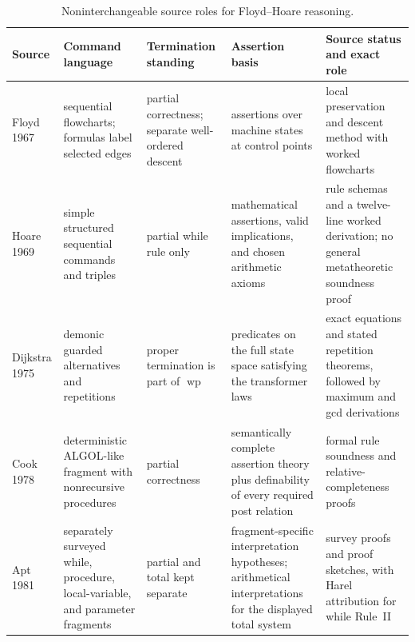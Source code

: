 \begin{table}[htbp]
\centering\scriptsize
\begin{tabularx}{\textwidth}{@{}l X X X X@{}}
\toprule
Source & Command language & Termination standing & Assertion basis &
Source status and exact role \\
\midrule
Floyd 1967 & sequential flowcharts; formulas label selected edges &
partial correctness; separate well-ordered descent & assertions over machine
states at control points & local preservation and descent method with worked
flowcharts \\
Hoare 1969 & simple structured sequential commands and triples &
partial while rule only & mathematical assertions, valid implications, and
chosen arithmetic axioms & rule schemas and a twelve-line worked derivation;
no general metatheoretic soundness proof \\
Dijkstra 1975 & demonic guarded alternatives and repetitions &
proper termination is part of \(\operatorname{wp}\) & predicates on the full
state space satisfying the transformer laws & exact equations and stated
repetition theorems, followed by maximum and gcd derivations \\
Cook 1978 & deterministic ALGOL-like fragment with nonrecursive procedures &
partial correctness & semantically complete assertion theory plus definability
of every required post relation & formal rule soundness and relative-
completeness proofs \\
Apt 1981 & separately surveyed while, procedure, local-variable, and parameter
fragments & partial and total kept separate & fragment-specific interpretation
hypotheses; arithmetical interpretations for the displayed total system &
survey proofs and proof sketches, with Harel attribution for while Rule~II \\
\bottomrule
\end{tabularx}
\caption{Noninterchangeable source roles for Floyd--Hoare reasoning.}
\label{tab:p09-hoare-source-roles}
\end{table}
